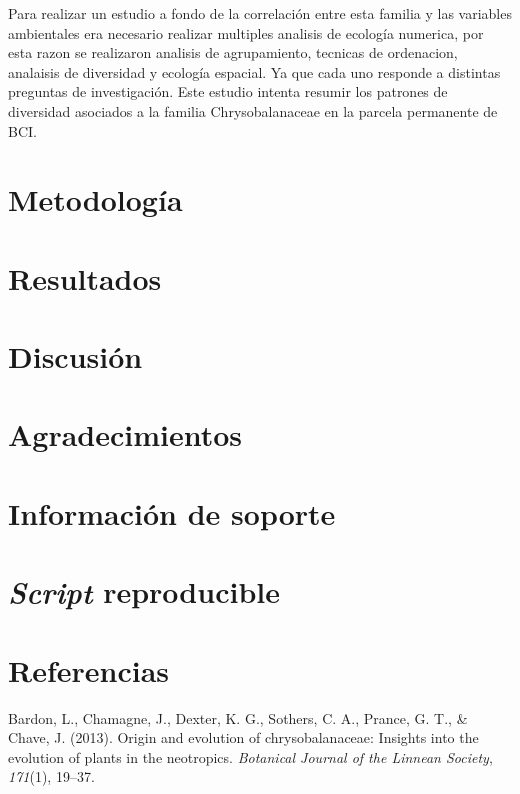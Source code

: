 \documentclass[11pt,]{article}
\begin{document}
Para realizar un estudio a fondo de la correlación entre esta familia y
las variables ambientales era necesario realizar multiples analisis de
ecología numerica, por esta razon se realizaron analisis de
agrupamiento, tecnicas de ordenacion, analaisis de diversidad y ecología
espacial. Ya que cada uno responde a distintas preguntas de
investigación. Este estudio intenta resumir los patrones de diversidad
asociados a la familia Chrysobalanaceae en la parcela permanente de BCI.

\section{Metodología}\label{metodologuxeda}

\section{Resultados}\label{resultados}

\section{Discusión}\label{discusiuxf3n}

\section{Agradecimientos}\label{agradecimientos}

\section{Información de soporte}\label{informaciuxf3n-de-soporte}

\section{\texorpdfstring{\emph{Script}
reproducible}{Script reproducible}}\label{script-reproducible}

\section*{Referencias}\label{referencias}

\hypertarget{refs}{}
\hypertarget{ref-bardon2013origin}{}
Bardon, L., Chamagne, J., Dexter, K. G., Sothers, C. A., Prance, G. T.,
\& Chave, J. (2013). Origin and evolution of chrysobalanaceae: Insights
into the evolution of plants in the neotropics. \emph{Botanical Journal
of the Linnean Society}, \emph{171}(1), 19--37.
\end{document}
